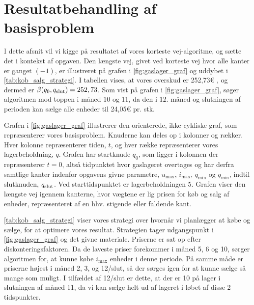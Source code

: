 \section{Resultatbehandling af basisproblem}

I dette afsnit vil vi kigge på resultatet af vores korteste vej-algoritme, og sætte det i kontekst af opgaven. Den længste vej, givet ved korteste vej hvor alle kanter er ganget $(-1)$, er illustreret på grafen i \autoref{fig:gaslager_graf} og uddybet i \autoref{tab:kob_salg_strategi}. I tabellen vises, at vores overskud er 252,73€ %
, og dermed er $\beta (q_0, q_{\textrm{slut}}) = 252,73$. Som vist på grafen i \autoref{fig:gaslager_graf}, søger algoritmen mod toppen i måned 10 og 11, da den i 12. måned og slutningen af perioden kan sælge alle enheder til 24,05€ pr. stk. 



Grafen i \autoref{fig:gaslager_graf} illustrerer den orienterede, ikke-cykliske graf, som repræsenterer vores basisproblem. Knuderne kan deles op i kolonner og rækker. Hver kolonne repræsenterer tiden, $t$, og hver række repræsenterer vores lagerbeholdning, $q$. Grafen har startknude $q_0$, som ligger i kolonnen der repræsenterer $t=0$, altså tidpunktet hvor gaslageret overtages og har derfra samtlige kanter indenfor opgavens givne parametre, $u_{\max }$, $i_{\max }$, $q_{\min }$ og $q_{\min }$, indtil slutknuden, $q_{\textrm{slut}}$. Ved starttidspunktet er lagerbeholdningen 5. Grafen viser den længste vej igennem kanterne, hvor vægtene er lig prisen for køb og salg af enheder, repræsenteret af en hhv. stigende eller faldende kant.



\autoref{tab:kob_salg_strategi} viser vores strategi over hvornår vi planlægger at købe og sælge, for at optimere vores resultat. Strategien tager udgangspunkt i \autoref{fig:gaslager_graf} og det givne materiale. Priserne er sat op efter diskonteringsfaktoren.%
 Da de laveste priser forekommer i måned 5, 6 og 10, sørger algoritmen for, at kunne købe $i_{\max}$ enheder i denne periode. På samme måde er priserne højest i måned 2, 3, og 12/slut, så der sørges igen for at kunne sælge så mange som muligt. I tilfældet af 12/slut er dette, at der er 10 på lager i slutningen af måned 11, da vi kan sælge helt ud af lageret i løbet af disse 2 tidspunkter.
